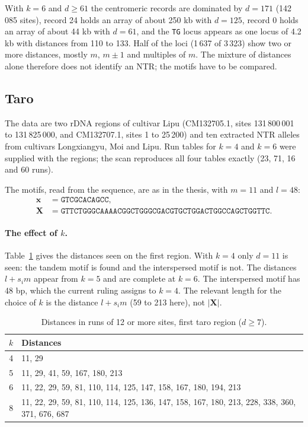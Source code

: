 \documentclass[11pt,a4paper]{article}
\begin{document}
With $k=6$ and $d\ge 61$ the centromeric records are dominated by $d=171$
(142\,085 sites), record 24 holds an array of about 250 kb with $d=125$,
record 0 holds an array of about 44 kb with $d=61$, and the \texttt{TG} locus
appears as one locus of 4.2 kb with distances from 110 to 133. Half of the loci
(1\,637 of 3\,323) show two or more distances, mostly $m$, $m\pm 1$ and
multiples of $m$. The mixture of distances alone therefore does not identify an
NTR; the motifs have to be compared.

\subsection{Taro}\label{sec:taro}
The data are two rDNA regions of cultivar Lipu (CM132705.1, sites 131\,800\,001
to 131\,825\,000, and CM132707.1, sites 1 to 25\,200) and ten extracted NTR
alleles from cultivars Longxiangyu, Moi and Lipu. Run tables for $k=4$ and
$k=6$ were supplied with the regions; the scan reproduces all four tables
exactly (23, 71, 16 and 60 runs).

The motifs, read from the sequence, are as in the thesis, with $m=11$ and
$l=48$:
\begin{align*}
\mathbf{x}&=\texttt{GTCGCACAGCC},\\
\mathbf{X}&=\texttt{GTTCTGGGCAAAACGGCTGGGCGACGTGCTGGACTGGCCAGCTGGTTC}.
\end{align*}

\paragraph{The effect of $k$.} Table~\ref{tab:tarok} gives the distances seen
on the first region. With $k=4$ only $d=11$ is seen: the tandem motif is found
and the interspersed motif is not. The distances $l+s_im$ appear from $k=5$ and
are complete at $k=6$. The interspersed motif has 48 bp, which the current
ruling assigns to $k=4$. The relevant length for the choice of $k$ is the
distance $l+s_im$ (59 to 213 here), not $|\mathbf{X}|$.

\begin{table}[h]\centering
\caption{Distances in runs of 12 or more sites, first taro region ($d\ge 7$).}\label{tab:tarok}
\begin{tabular}{rp{11cm}}
\toprule
$k$ & Distances \\
\midrule
4 & 11, 29 \\
5 & 11, 29, 41, 59, 167, 180, 213 \\
6 & 11, 22, 29, 59, 81, 110, 114, 125, 147, 158, 167, 180, 194, 213 \\
8 & 11, 22, 29, 59, 81, 110, 114, 125, 136, 147, 158, 167, 180, 213, 228, 338, 360, 371, 676, 687 \\
\bottomrule
\end{tabular}
\end{table}
\end{document}
